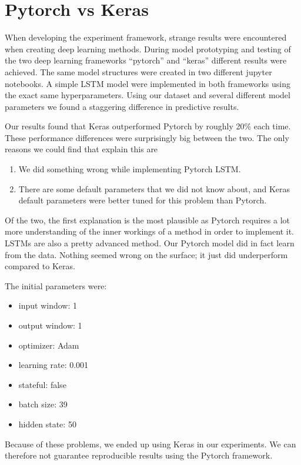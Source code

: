 \section{Pytorch vs Keras}
\label{section:method:pytorch-vs-keras}


When developing the experiment framework, strange results were encountered when creating deep learning methods.
During model prototyping and testing of the two deep learning frameworks ``pytorch'' and ``keras''
different results were achieved.
The same model structures were created in two different jupyter notebooks.
A simple LSTM model were implemented in both frameworks using the exact same hyperparameters.
Using our dataset and several different model parameters we found a staggering difference in predictive results.

Our results found that Keras outperformed Pytorch by roughly 20\% each time.
These performance differences were surprisingly big between the two.
The only reasons we could find that explain this are
\begin{enumerate}
  \item We did something wrong while implementing Pytorch LSTM.
  \item There are some default parameters that we did not know about, and Keras
        default parameters were better tuned for this problem than Pytorch.
\end{enumerate}

Of the two, the first explanation is the most plausible as Pytorch requires a lot more understanding
of the inner workings of a method in order to implement it.
LSTMs are also a pretty advanced method. Our Pytorch model did in fact learn
from the data. Nothing seemed wrong on the surface; it just did underperform compared to Keras.

The initial parameters were:
\begin{itemize}
  \item input window: 1
  \item output window: 1
  \item optimizer: Adam
  \item learning rate: 0.001
  \item stateful: false
  \item batch size: 39
  \item hidden state: 50
\end{itemize}

Because of these problems, we ended up using Keras in our experiments.
We can therefore not guarantee reproducible results using the Pytorch framework.

